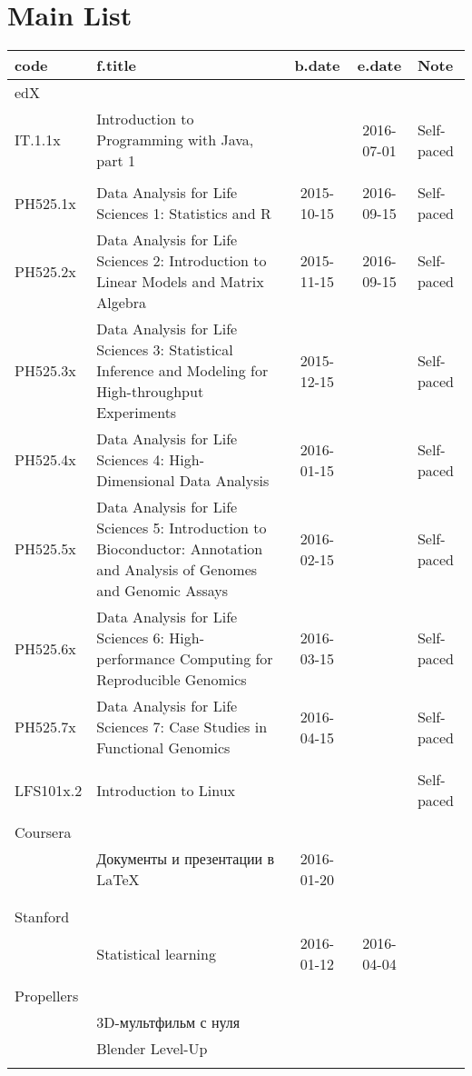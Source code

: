 \documentclass[a4paper,12pt]{article} %
\begin{document}
\tableofcontents

\newpage
\section{Main List}
\begin{longtable}{|l|p{6cm}|c|c|l|}
	\hline
	code & f.title & b.date & e.date & Note \\
	\hline
	\multicolumn{5}{|l|}{edX}\\
	\hline
	IT.1.1x & Introduction to Programming with Java, part 1 &  & 2016-07-01 & Self-paced\\
	\hline
	&  &  &  &  \\
	\hline
	PH525.1x & Data Analysis for Life Sciences 1: Statistics and R & 2015-10-15 & 2016-09-15 & Self-paced \\
	\hline
	PH525.2x & Data Analysis for Life Sciences 2: Introduction to Linear Models and Matrix Algebra & 2015-11-15 & 2016-09-15 & Self-paced \\
	\hline
	PH525.3x & Data Analysis for Life Sciences 3: Statistical Inference and Modeling for High-throughput Experiments & 2015-12-15 &  & Self-paced \\
	\hline
	PH525.4x & Data Analysis for Life Sciences 4: High-Dimensional Data Analysis & 2016-01-15 &  & Self-paced \\
	\hline
	PH525.5x & Data Analysis for Life Sciences 5: Introduction to Bioconductor: Annotation and Analysis of Genomes and Genomic Assays & 2016-02-15 &  & Self-paced \\
	\hline
	PH525.6x & Data Analysis for Life Sciences 6: High-performance Computing for Reproducible Genomics & 2016-03-15 &  & Self-paced \\
	\hline
	PH525.7x & Data Analysis for Life Sciences 7: Case Studies in Functional Genomics & 2016-04-15 &  & Self-paced \\
	\hline
	&  &  &  &  \\
	\hline
	LFS101x.2 & Introduction to Linux &  &  & Self-paced \\
	\hline
	&  &  &  &  \\
	\hline
	\multicolumn{5}{|l|}{Coursera}\\
	\hline
	& Документы и презентации в \LaTeX & 2016-01-20 &  &  \\
	\hline
	&  &  &  &  \\
	\hline
	&  &  &  &  \\
	\hline
	\multicolumn{5}{|l|}{Stanford}\\
	\hline
	& Statistical learning & 2016-01-12 & 2016-04-04 &  \\
	\hline
	&  &  &  &  \\
	\hline
	\multicolumn{5}{|l|}{Propellers}\\
	\hline
	& 3D-мультфильм с нуля &  &  &  \\
	\hline
	& Blender Level-Up &  &  &  \\
	\hline
	&  &  &  &  \\
	\hline
\end{longtable}
\end{document}
